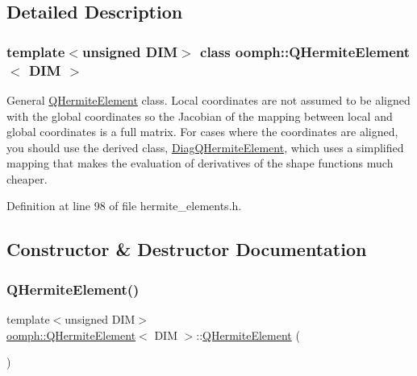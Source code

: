 \subsection{Detailed Description}
\subsubsection*{template$<$unsigned D\+IM$>$\newline
class oomph\+::\+Q\+Hermite\+Element$<$ D\+I\+M $>$}

General \hyperlink{classoomph_1_1QHermiteElement}{Q\+Hermite\+Element} class. Local coordinates are not assumed to be aligned with the global coordinates so the Jacobian of the mapping between local and global coordinates is a full matrix. For cases where the coordinates are aligned, you should use the derived class, \hyperlink{classoomph_1_1DiagQHermiteElement}{Diag\+Q\+Hermite\+Element}, which uses a simplified mapping that makes the evaluation of derivatives of the shape functions much cheaper. 

Definition at line 98 of file hermite\+\_\+elements.\+h.



\subsection{Constructor \& Destructor Documentation}
\mbox{\label{classoomph_1_1QHermiteElement_a226d0763bce1e477ee64254398a2c677}} 
\subsubsection{\texorpdfstring{Q\+Hermite\+Element()}{QHermiteElement()}\hspace{0.1cm}{\footnotesize\ttfamily [1/2]}}
{\footnotesize\ttfamily template$<$unsigned D\+IM$>$ \\
\hyperlink{classoomph_1_1QHermiteElement}{oomph\+::\+Q\+Hermite\+Element}$<$ D\+IM $>$\+::\hyperlink{classoomph_1_1QHermiteElement}{Q\+Hermite\+Element} (\begin{DoxyParamCaption}{ }\end{DoxyParamCaption})\hspace{0.3cm}{\ttfamily [inline]}}



